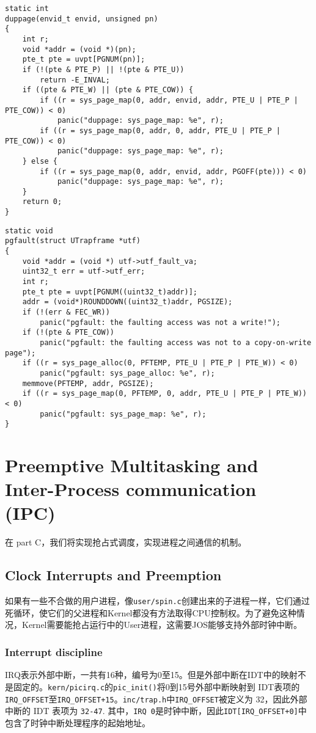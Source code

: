 \documentclass[11pt]{article}
\begin{document}
\begin{lstlisting}[title=lib/fork.c]
static int
duppage(envid_t envid, unsigned pn)
{
	int r;
	void *addr = (void *)(pn);
	pte_t pte = uvpt[PGNUM(pn)];
	if (!(pte & PTE_P) || !(pte & PTE_U))
	 	return -E_INVAL;
	if ((pte & PTE_W) || (pte & PTE_COW)) {
		if ((r = sys_page_map(0, addr, envid, addr, PTE_U | PTE_P | PTE_COW)) < 0)
			panic("duppage: sys_page_map: %e", r);
		if ((r = sys_page_map(0, addr, 0, addr, PTE_U | PTE_P | PTE_COW)) < 0)
			panic("duppage: sys_page_map: %e", r);
	} else {
		if ((r = sys_page_map(0, addr, envid, addr, PGOFF(pte))) < 0)
			panic("duppage: sys_page_map: %e", r);
	}
	return 0;
}
\end{lstlisting}

\begin{lstlisting}[title=lib/fork.c]
static void
pgfault(struct UTrapframe *utf)
{
	void *addr = (void *) utf->utf_fault_va;
	uint32_t err = utf->utf_err;
	int r;
 	pte_t pte = uvpt[PGNUM((uint32_t)addr)];
	addr = (void*)ROUNDDOWN((uint32_t)addr, PGSIZE);
	if (!(err & FEC_WR))
		panic("pgfault: the faulting access was not a write!");
	if (!(pte & PTE_COW))
		panic("pgfault: the faulting access was not to a copy-on-write page");
	if ((r = sys_page_alloc(0, PFTEMP, PTE_U | PTE_P | PTE_W)) < 0)
		panic("pgfault: sys_page_alloc: %e", r);
	memmove(PFTEMP, addr, PGSIZE); 
	if ((r = sys_page_map(0, PFTEMP, 0, addr, PTE_U | PTE_P | PTE_W)) < 0)
		panic("pgfault: sys_page_map: %e", r);
}
\end{lstlisting}
\section{Preemptive Multitasking and Inter-Process communication (IPC)}
在 part C，我们将实现抢占式调度，实现进程之间通信的机制。
\subsection{Clock Interrupts and Preemption}
如果有一些不合做的用户进程，像\lstinline|user/spin.c|创建出来的子进程一样，它们通过死循环，使它们的父进程和Kernel都没有方法取得CPU控制权。为了避免这种情况，Kernel需要能抢占运行中的User进程，这需要JOS能够支持外部时钟中断。 

\subsubsection{Interrupt discipline}
IRQ表示外部中断，一共有16种，编号为0至15。但是外部中断在IDT中的映射不是固定的。\lstinline|kern/picirq.c|的\lstinline|pic_init()|将0到15号外部中断映射到 IDT表项的\lstinline|IRQ_OFFSET|至\lstinline|IRQ_OFFSET+15|。\lstinline|inc/trap.h|中\lstinline|IRQ_OFFSET|被定义为 32，因此外部中断的 IDT 表项为 \lstinline|32-47|. 其中，\lstinline|IRQ 0|是时钟中断，因此\lstinline|IDT[IRQ_OFFSET+0]|中包含了时钟中断处理程序的起始地址。 
\end{document}
